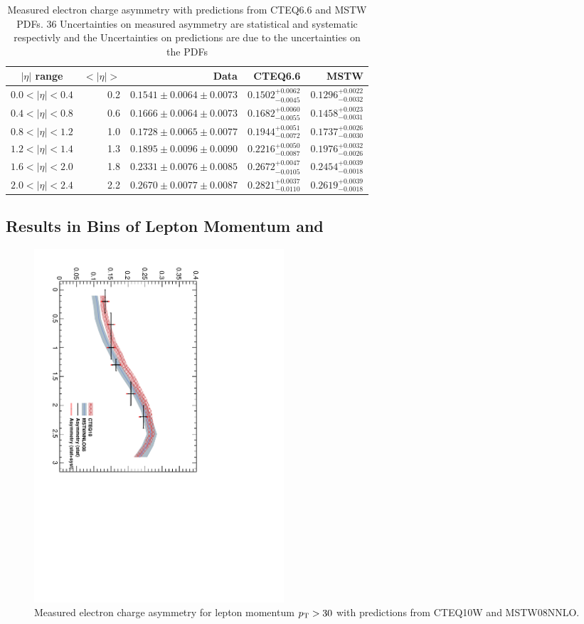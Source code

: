 \begin{table}[htb]
\begin{center}
\begin{tabular}{crrrr}
$|\eta|$ range & $<|\eta|>$ & Data & CTEQ6.6 & MSTW \\
\hline 
$0.0<|\eta|<0.4$ & 0.2 & $0.1541\pm0.0064\pm0.0073$ & $0.1502^{+0.0062}_{-0.0045}$ & $0.1296^{+0.0022}_{-0.0032}$\\
$0.4<|\eta|<0.8$ & 0.6 & $0.1666\pm0.0064\pm0.0073$ & $0.1682^{+0.0060}_{-0.0055}$ & $0.1458^{+0.0023}_{-0.0031}$\\
$0.8<|\eta|<1.2$ & 1.0 & $0.1728\pm0.0065\pm0.0077$ & $0.1944^{+0.0051}_{-0.0072}$ & $0.1737^{+0.0026}_{-0.0030}$\\
$1.2<|\eta|<1.4$ & 1.3 & $0.1895\pm0.0096\pm0.0090$ & $0.2216^{+0.0050}_{-0.0087}$ & $0.1976^{+0.0032}_{-0.0026}$\\
$1.6<|\eta|<2.0$ & 1.8 & $0.2331\pm0.0076\pm0.0085$ & $0.2672^{+0.0047}_{-0.0105}$ & $0.2454^{+0.0039}_{-0.0018}$\\
$2.0<|\eta|<2.4$ & 2.2 & $0.2670\pm0.0077\pm0.0087$ & $0.2821^{+0.0037}_{-0.0110}$ & $0.2619^{+0.0039}_{-0.0018}$\\
\end{tabular}
\caption{Measured electron charge asymmetry with predictions from CTEQ6.6 and MSTW PDFs.  36 Uncertainties on measured asymmetry are statistical and systematic respectivly and the Uncertainties on predictions are due to the uncertainties on the PDFs}
\label{tab:results}
\end{center}
\end{table}




\subsection{Results in Bins of Lepton Momentum and \ETm}

\begin{figure}[htb]
  \begin{center}
  \includegraphics*[width=0.45\textwidth,angle=90]{Asym_30}
  \caption{\label{fig:asym30}Measured electron charge asymmetry for lepton momentum $p_{\mathrm{T}}>30$ with predictions from CTEQ10W and MSTW08NNLO.}
  \end{center}
\end{figure}

